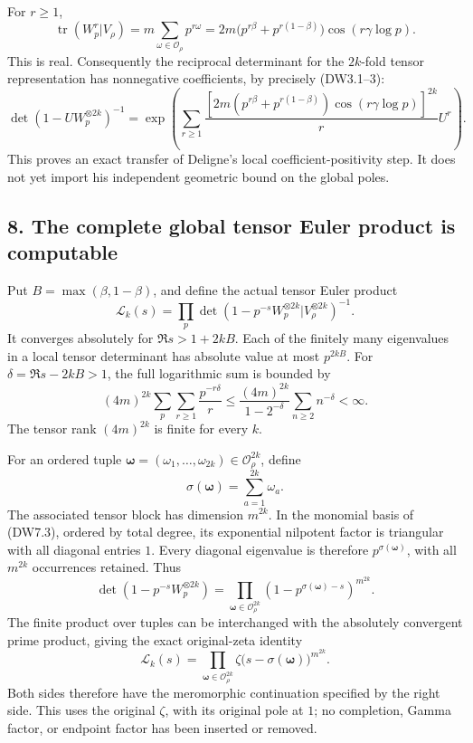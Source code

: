 For \(r\ge1\), \[
\operatorname{tr}(W_p^r|V_\rho)
=m\sum_{\omega\in\mathcal O_\rho}p^{r\omega}
=2m\bigl(p^{r\beta}+p^{r(1-\beta)}\bigr)
\cos(r\gamma\log p).
\tag{DW7.6}
\] This is real. Consequently the reciprocal determinant for the
\(2k\)-fold tensor representation has nonnegative coefficients, by
precisely (DW3.1--3): \[
\det(1-UW_p^{\otimes2k})^{-1}
=\exp\left(
\sum_{r\ge1}\frac{
\left[2m(p^{r\beta}+p^{r(1-\beta)})
\cos(r\gamma\log p)\right]^{2k}}rU^r
\right).
\tag{DW7.7}
\] This proves an exact transfer of Deligne's local
coefficient-positivity step. It does not yet import his independent
geometric bound on the global poles.

\subsection{8. The complete global tensor Euler product is
computable}\label{the-complete-global-tensor-euler-product-is-computable}

Put \(B=\max(\beta,1-\beta)\), and define the actual tensor Euler
product \[
\mathcal L_k(s)=
\prod_p\det(1-p^{-s}W_p^{\otimes2k}|V_\rho^{\otimes2k})^{-1}.
\tag{DW8.1}
\] It converges absolutely for \(\Re s>1+2kB\). Each of the finitely
many eigenvalues in a local tensor determinant has absolute value at
most \(p^{2kB}\). For \(\delta=\Re s-2kB>1\), the full logarithmic sum
is bounded by \[
(4m)^{2k}\sum_p\sum_{r\ge1}\frac{p^{-r\delta}}r
\le
\frac{(4m)^{2k}}{1-2^{-\delta}}\sum_{n\ge2}n^{-\delta}<\infty.
\tag{DW8.1a}
\] The tensor rank \((4m)^{2k}\) is finite for every \(k\).

For an ordered tuple
\(\boldsymbol\omega=(\omega_1,\ldots,\omega_{2k})\in\mathcal O_\rho^{2k}\),
define \[
\sigma(\boldsymbol\omega)=\sum_{a=1}^{2k}\omega_a.
\tag{DW8.2}
\] The associated tensor block has dimension \(m^{2k}\). In the monomial
basis of (DW7.3), ordered by total degree, its exponential nilpotent
factor is triangular with all diagonal entries \(1\). Every diagonal
eigenvalue is therefore \(p^{\sigma(\boldsymbol\omega)}\), with all
\(m^{2k}\) occurrences retained. Thus \[
\det(1-p^{-s}W_p^{\otimes2k})
=
\prod_{\boldsymbol\omega\in\mathcal O_\rho^{2k}}
(1-p^{\sigma(\boldsymbol\omega)-s})^{m^{2k}}.
\tag{DW8.3}
\] The finite product over tuples can be interchanged with the
absolutely convergent prime product, giving the exact original-zeta
identity \[
\boxed{\displaystyle
\mathcal L_k(s)=
\prod_{\boldsymbol\omega\in\mathcal O_\rho^{2k}}
\zeta\bigl(s-\sigma(\boldsymbol\omega)\bigr)^{m^{2k}}.}
\tag{DW8.4}
\] Both sides therefore have the meromorphic continuation specified by
the right side. This uses the original \(\zeta\), with its original pole
at \(1\); no completion, Gamma factor, or endpoint factor has been
inserted or removed.

